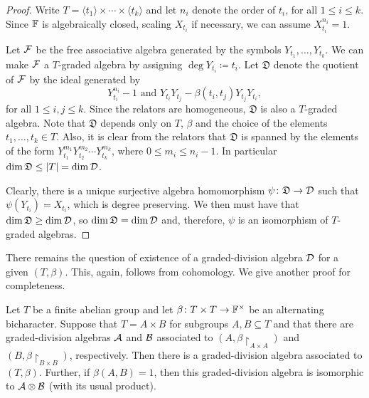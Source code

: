 \begin{proof}
    Write $T = \langle t_1 \rangle \times \cdots \times \langle t_k \rangle$ and let $n_i$ denote the order of $t_i$, for all $1\leq i \leq k$. 
    Since $\mathbb{F}$ is algebraically closed, scaling $X_{t_i}$ if necessary, we can assume  $X_{t_i}^{n_i} = 1$. 
    
    Let $\mathcal F$ be the free associative algebra generated by the symbols $Y_{t_1}, \ldots, Y_{t_k}$. 
    We can make $\mathcal F$ a $T$-graded algebra by assigning $\deg Y_{t_i} \coloneqq t_i$. 
    Let $\mathfrak{D}$ denote the quotient of $\mathcal F$ by the ideal generated by 
    \[\label{eq:relations-D}
        Y_{t_i}^{n_i} - 1 \text{ and }Y_{t_i}Y_{t_j} - \beta(t_i, t_j) Y_{t_j}Y_{t_i},
    \] 
    for all $1\leq i,j \leq k$. 
    Since the relators are homogeneous, $\mathfrak{D}$ is also a $T$-graded algebra. 
    Note that $\mathfrak{D}$ depends only on $T$, $\beta$ and the choice of the elements $t_1, \ldots, t_k \in T$.  
    Also, it is clear from the relators that $\mathfrak{D}$ is spanned by the elements of the form $Y_{t_1}^{m_1}Y_{t_2}^{m_2} \cdots Y_{t_k}^{m_k}$, where $0\leq m_i \leq n_i - 1$. 
    In particular $\dim \mathfrak{D} \leq |T| = \dim \mathcal{D}$.
    
    Clearly, there is a unique surjective algebra homomorphism $\psi\colon \mathfrak{D} \to \mathcal{D}$ such that $\psi(Y_{t_i}) = X_{t_i}$, which is degree preserving. 
    We then must have that $\dim \mathfrak{D} \geq \dim \mathcal{D}$, so $\dim \mathfrak{D} = \dim \mathcal{D}$ and, therefore, $\psi$ is an isomorphism of $T$-graded algebras. 
\end{proof}

There remains the question of existence of a graded-division algebra $\mathcal{D}$ for a given $(T,\beta)$. 
This, again, follows from cohomology. 
We give another proof for completeness. 

\begin{lemma}\label{lemma:colour-tensor-product}
    Let $T$ be a finite abelian group and let $\beta\colon T\times T \to \mathbb{F}^\times$ be an alternating bicharacter. 
    Suppose that $T = A\times B$ for subgroups $A, B \subseteq T$ and that there are graded-division algebras $\mathcal A$ and $\mathcal B$ associated to $(A, \beta\restriction_{A\times A})$ and $(B, \beta\restriction_{B\times B})$, respectively. 
    Then there is a graded-division algebra associated to $(T, \beta)$. 
    Further, if $\beta(A,B) = 1$, then this graded-division algebra is isomorphic to $\mathcal A \otimes \mathcal B$ (with its usual product).
\end{lemma}

